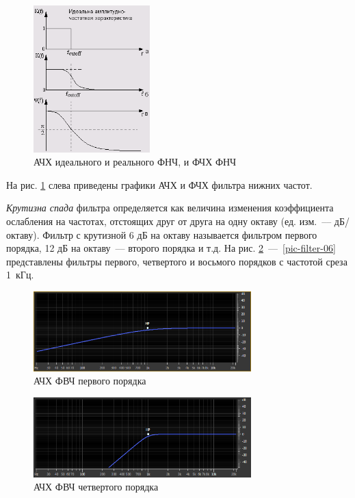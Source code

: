\documentclass[oneside, final, 14pt]{extreport}
\begin{document}
\begin{figure}[h!]
  \centering
  \includegraphics[width=0.4\textwidth]{pic-filter-02}
  \caption{АЧХ идеального и реального ФНЧ, и ФЧХ ФНЧ}
  \label{pic-filter-02}
\end{figure}

На рис. \ref{pic-filter-02} слева приведены графики АЧХ и ФЧХ фильтра нижних частот.

\emph{Крутизна спада} фильтра определяется как величина изменения коэффициента ослабления на частотах, отстоящих друг от друга на одну октаву (ед. изм.~--– дБ/октаву). Фильтр с крутизной 6 дБ на октаву называется фильтром первого порядка, 12 дБ на октаву~--– второго порядка и т.д.
На рис. \ref{pic-filter-08}~---~\ref{pic-filter-06} представлены фильтры первого, четвертого и восьмого порядков с частотой среза 1~кГц.

\begin{figure}[h!]
  \centering
  \includegraphics[width=0.75\textwidth]{pic-filter-08}
  \caption{АЧХ ФВЧ первого порядка}
  \label{pic-filter-08}
\end{figure}

\begin{figure}[h!]
  \centering
  \includegraphics[width=0.75\textwidth]{pic-filter-07}
  \caption{АЧХ ФВЧ четвертого порядка}
  \label{pic-filter-07}
\end{figure}
\end{document}
